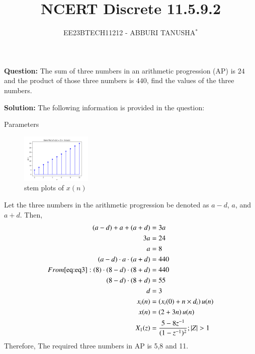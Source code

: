 \documentclass[journal,12pt,twocolumn]{IEEEtran}
\title{NCERT Discrete 11.5.9.2}
\author{EE23BTECH11212 - ABBURI TANUSHA$^{*}$}
\theoremstyle{remark}
\begin{document}
\maketitle

\textbf{Question:} 
The sum of three numbers in an arithmetic progression (AP) is $24$ and the product of those three numbers is $440$, find the values of the three numbers.

\textbf{Solution: }
The following information is provided in the question:
\begin{table}[h]
 	\centering
 	\resizebox{6 cm}{!}{
 		
 	}
 	\vspace{6 pt}
 	\caption{Parameters}
 	\label{tab:my_label} 
 \end{table}
 \begin{figure}[h!]
  \centering
  \includegraphics[width=0.3\textwidth]{figs/Figure_1.png} 
  \caption{stem plots of $x(n)$ }
  \label{fig:1}
\end{figure}
\newline
Let the three numbers in the arithmetic progression be denoted as $a - d$, $a$, and $a + d$. Then,
\begin{align}
    (a - d) + a + (a + d) &= 3a \\
     3a &= 24 \\
    a &= 8 \\
    \label{eq:eq3} 
    (a - d) \cdot a \cdot (a + d) &= 440 \\
  From \eqref{eq:eq3} :
    (8) \cdot (8-d) \cdot (8+d) &= 440 \\
    (8-d) \cdot (8+d) &= 55 \\
    d &= 3 \\
    x_i(n) &= \left(x_i(0) + n \times d_i\right) u(n) \\
    x(n) &= \left(2 + 3n\right)u(n)\\
    X_1(z) &= \frac{5 - 8z^{-1}}{(1-z^{-1})^2} ; |Z|>1
\end{align}
Therefore, The required three numbers in AP is 5,8 and 11.
\end{document}
